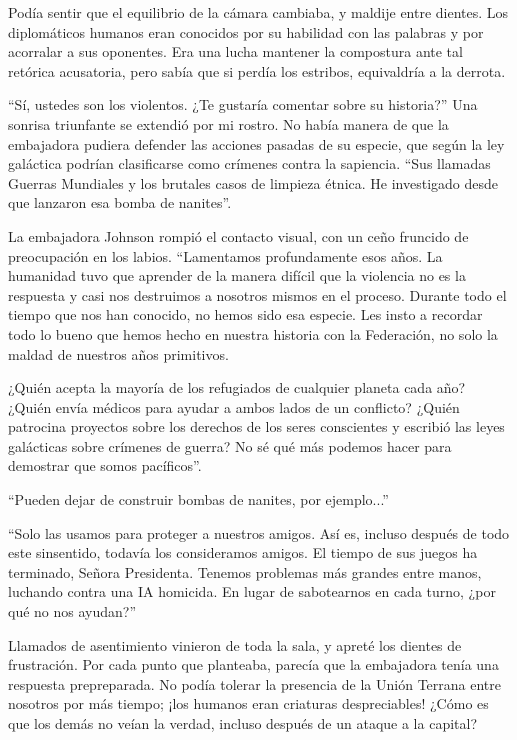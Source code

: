 \documentclass[spanish,12pt,a4paper,oneside,titlepage]{book}
\begin{document}
    Podía sentir que el equilibrio de la cámara cambiaba, y maldije entre dientes. Los diplomáticos humanos eran conocidos por su habilidad con las palabras y por acorralar a sus oponentes. Era una lucha mantener la compostura ante tal retórica acusatoria, pero sabía que si perdía los estribos, equivaldría a la derrota.

    ``Sí, ustedes son los violentos. ¿Te gustaría comentar sobre su historia?'' Una sonrisa triunfante se extendió por mi rostro. No había manera de que la embajadora pudiera defender las acciones pasadas de su especie, que según la ley galáctica podrían clasificarse como crímenes contra la sapiencia. ``Sus llamadas Guerras Mundiales y los brutales casos de limpieza étnica. He investigado desde que lanzaron esa bomba de nanites''.

    La embajadora Johnson rompió el contacto visual, con un ceño fruncido de preocupación en los labios. ``Lamentamos profundamente esos años. La humanidad tuvo que aprender de la manera difícil que la violencia no es la respuesta y casi nos destruimos a nosotros mismos en el proceso. Durante todo el tiempo que nos han conocido, no hemos sido esa especie. Les insto a recordar todo lo bueno que hemos hecho en nuestra historia con la Federación, no solo la maldad de nuestros años primitivos.

    ¿Quién acepta la mayoría de los refugiados de cualquier planeta cada año? ¿Quién envía médicos para ayudar a ambos lados de un conflicto? ¿Quién patrocina proyectos sobre los derechos de los seres conscientes y escribió las leyes galácticas sobre crímenes de guerra? No sé qué más podemos hacer para demostrar que somos pacíficos''.

    ``Pueden dejar de construir bombas de nanites, por ejemplo...''

    ``Solo las usamos para proteger a nuestros amigos. Así es, incluso después de todo este sinsentido, todavía los consideramos amigos. El tiempo de sus juegos ha terminado, Señora Presidenta. Tenemos problemas más grandes entre manos, luchando contra una IA homicida. En lugar de sabotearnos en cada turno, ¿por qué no nos ayudan?''

    Llamados de asentimiento vinieron de toda la sala, y apreté los dientes de frustración. Por cada punto que planteaba, parecía que la embajadora tenía una respuesta prepreparada. No podía tolerar la presencia de la Unión Terrana entre nosotros por más tiempo; ¡los humanos eran criaturas despreciables! ¿Cómo es que los demás no veían la verdad, incluso después de un ataque a la capital?
\end{document}
